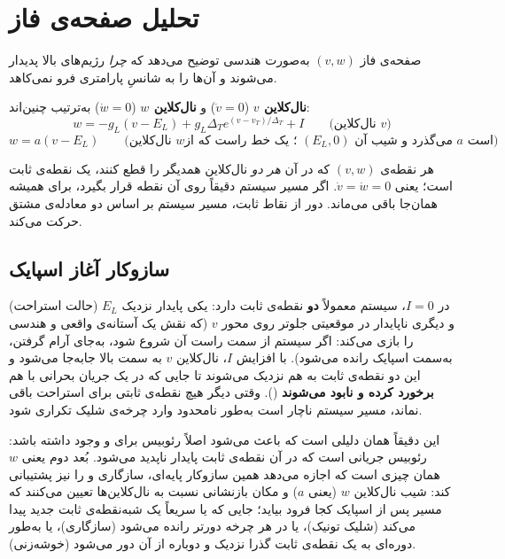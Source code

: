 \documentclass[11pt,a4paper]{article}
\begin{document}
\section{تحلیل صفحه‌ی فاز}
صفحه‌ی فاز $(v,w)$ به‌صورت هندسی توضیح می‌دهد که \emph{چرا} رژیم‌های بالا پدیدار می‌شوند و آن‌ها را به شانسِ پارامتری فرو نمی‌کاهد.

\begin{defbox}
	\textbf{نال‌کلاین $v$}
	($\dot v = 0$)
	و
	\textbf{نال‌کلاین $w$}
	($\dot w = 0$)
	به‌ترتیب چنین‌اند:
	$$w = -g_L(v-E_L) + g_L\Delta_T e^{(v-v_T)/\Delta_T} + I \qquad\text{(نال‌کلاین }v\text{)}$$
	$$w = a(v - E_L) \qquad\text{(نال‌کلاین }w\text{؛ یک خط راست که از }(E_L,0)\text{ می‌گذرد و شیب آن }a\text{ است)}$$
\end{defbox}

\begin{defbox}
	هر نقطه‌ی $(v,w)$ که در آن \emph{هر دو} نال‌کلاین همدیگر را قطع کنند، یک نقطه‌ی ثابت است؛ یعنی
	$\dot v = \dot w = 0$.
	اگر مسیر سیستم دقیقاً روی آن نقطه قرار بگیرد، برای همیشه همان‌جا باقی می‌ماند. دور از نقاط ثابت، مسیر سیستم بر اساس دو معادله‌ی مشتق حرکت می‌کند.
\end{defbox}

\subsection{سازوکار آغاز اسپایک}
در $I=0$، سیستم معمولاً \textbf{دو} نقطه‌ی ثابت دارد: یکی پایدار نزدیک $E_L$ (حالت استراحت) و دیگری ناپایدار در موقعیتی جلوتر روی محور $v$ (که نقش یک آستانه‌ی واقعی و هندسی را بازی می‌کند: اگر سیستم از سمت راست آن شروع شود، به‌جای آرام گرفتن، به‌سمت اسپایک رانده می‌شود). با افزایش $I$، نال‌کلاین $v$ به سمت بالا جابه‌جا می‌شود و این دو نقطه‌ی ثابت به هم نزدیک می‌شوند تا جایی که در یک جریان بحرانی با هم \textbf{برخورد کرده و نابود می‌شوند}
().
وقتی دیگر هیچ نقطه‌ی ثابتی برای استراحت باقی نماند، مسیر سیستم ناچار است به‌طور نامحدود وارد چرخه‌ی شلیک تکراری شود.

\begin{keybox}
	این دقیقاً همان دلیلی است که باعث می‌شود اصلاً رئوبیس برای  و  وجود داشته باشد: رئوبیس جریانی است که در آن نقطه‌ی ثابت پایدار ناپدید می‌شود. بُعد دوم  یعنی $w$ همان چیزی است که اجازه می‌دهد همین سازوکار پایه‌ای، سازگاری و  را نیز پشتیبانی کند: شیب نال‌کلاین $w$ (یعنی $a$) و مکان بازنشانی نسبت به نال‌کلاین‌ها تعیین می‌کنند که مسیر پس از اسپایک کجا فرود بیاید؛ جایی که یا سریعاً یک شبه‌نقطه‌ی ثابت جدید پیدا می‌کند (شلیک تونیک)، یا در هر چرخه دورتر رانده می‌شود (سازگاری)، یا به‌طور دوره‌ای به یک نقطه‌ی ثابت گذرا نزدیک و دوباره از آن دور می‌شود (خوشه‌زنی).
\end{keybox}
\end{document}
